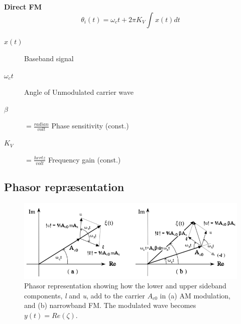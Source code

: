 \noindent \textbf{Direct FM}
\begin{equation}\label{eq:FM2}
\theta_i(t) =\omega_c t +2\pi K_V\int_{}^{} x(t) dt
\end{equation}

\begin{description}
	\item[$x(t)$] Baseband signal
	\item[$\omega_c t$] Angle of Unmodulated carrier wave
	\item[$\beta$]$=\frac{radian}{volt}$ Phase sensitivity (const.)
	\item[$K_V$]$=\frac{hertz}{volt}$ Frequency gain (const.)
\end{description}

\subsection{Phasor repræsentation}

\begin{figure} [H]
	\centering
	\includegraphics[width=\linewidth]{graphics/9.png}
	\caption{Phasor representation showing how the lower and upper sideband components, \textit{l}	and \textit{u}, add to the carrier $A_{c0}$ in (a) AM modulation, and (b) narrowband FM. The modulated wave becomes $y(t)=Re(\zeta)$.}
	\label{fig:9}
\end{figure}
